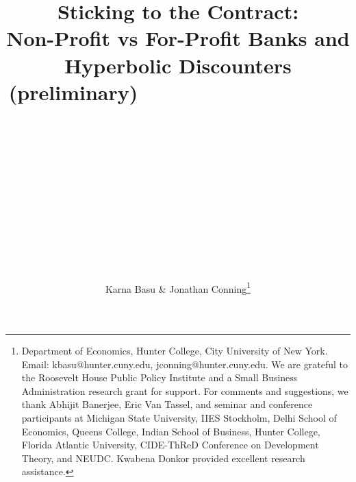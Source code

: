 \documentclass[11pt]{article}%
\begin{document}
\title{Sticking to the Contract: \\Non-Profit vs For-Profit Banks and Hyperbolic Discounters\\(preliminary)\ \ \ \ \ \ \ \ \ \ \ \ \ \ \ \ \ \ \ \ \ \ \ \ \ \ \ \ \ \ \ \ \ \ \ \ \ \ \ \ \ \ \ \ \ \ \ \ \ \ \ \ \ \ \ \ \ \ \ \ \ \ \ \ \ \ \ \ \ \ \ \ \ \ \ \ \ \ \ \ \ \ \ \ \ \ \ \ \ \ \ \ \ \ \ \ \ \ \ \ \ \ \ \ \ \ \ \ \ \ \ \ \ \ \ \ \ \ \ \ \ \ \ \ \ \ \ \ \ \ \ \ \ \ \ \ \ \ \ \ \ \ \ \ \ \ \ \ \ \ \ \ \ \ \ \ \ \ \ \ \ \ \ \ \ \ \ \ \ \ \ \ \ \ \ \ \ }
\author{Karna Basu \& Jonathan Conning\thanks{Department of Economics, Hunter College,
City University of New York. Email: kbasu@hunter.cuny.edu,
jconning@hunter.cuny.edu. We are grateful to the Roosevelt House Public Policy
Institute and a Small Business Administration research grant for support. For
comments and suggestions, we thank Abhijit Banerjee, Eric Van Tassel, and
seminar and conference participants at Michigan State University, IIES
Stockholm, Delhi School of Economics, Queens College, Indian School of
Business, Hunter College, Florida Atlantic University, CIDE-ThReD Conference
on Development Theory, and NEUDC. Kwabena Donkor provided excellent research
assistance.}}
\maketitle
\end{document}
